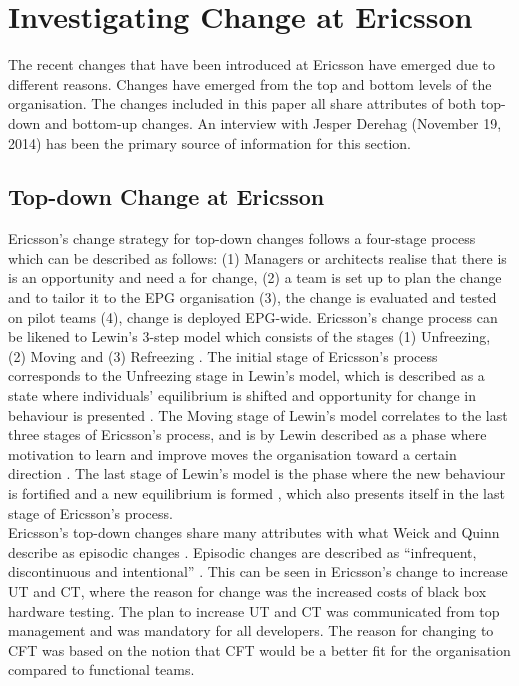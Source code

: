 \documentclass[final_report_innit.tex]{subfiles}
\begin{document}
\section{Investigating Change at Ericsson}
The recent changes that have been introduced at Ericsson have emerged due to different reasons. Changes have emerged from the top and bottom levels of the organisation. The changes included in this paper all share attributes of both top-down and bottom-up changes. An interview with Jesper Derehag (November 19, 2014) has been the primary source of information for this section. 

\subsection{Top-down Change at Ericsson}
Ericsson’s change strategy for top-down changes follows a four-stage process which can be described as follows: (1) Managers or architects realise that there is is an opportunity and need a for change, (2) a team is set up to plan the change and to tailor it to the EPG organisation (3), the change is evaluated and tested on pilot teams (4), change is deployed EPG-wide. Ericsson’s change process can be likened to Lewin’s 3-step model which consists of the stages (1) Unfreezing, (2) Moving and (3) Refreezing \cite{burnes2004kurt}. The initial stage of Ericsson’s process corresponds to the Unfreezing stage in Lewin’s model, which is described as a state where individuals’ equilibrium is shifted and opportunity for change in behaviour is presented \cite{burnes2004kurt}. The Moving stage of Lewin’s model correlates to the last three stages of Ericsson's process, and is by Lewin described as a phase where motivation to learn and improve moves the organisation toward a certain direction \cite{burnes2004kurt}. The last stage of Lewin’s model is the phase where the new behaviour is fortified and a new equilibrium is formed \cite{burnes2004kurt}, which also presents itself in the last stage of Ericsson’s process. 
\\

Ericsson’s top-down changes share many attributes with what Weick and Quinn describe as episodic changes \cite{weick1999organizational}. Episodic changes are described as “infrequent, discontinuous and intentional” \cite{weick1999organizational}. This can be seen in Ericsson’s change to increase UT and CT, where the reason for change was the increased costs of black box hardware testing. The plan to increase UT and CT was communicated from top management and was mandatory for all developers. The reason for changing to CFT was based on the notion that CFT would be a better fit for the organisation compared to functional teams. 
\\
\end{document}
